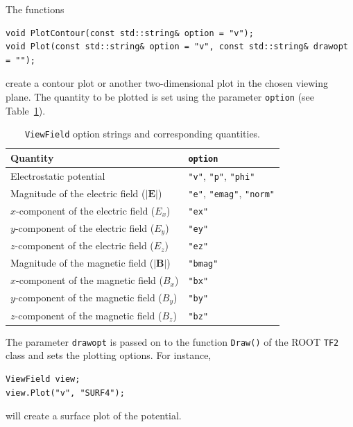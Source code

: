 The functions 
\begin{lstlisting}
void PlotContour(const std::string& option = "v");
void Plot(const std::string& option = "v", const std::string& drawopt = "");
\end{lstlisting}
create a contour plot or another two-dimensional plot in the chosen viewing plane.
The quantity to be plotted is set using the parameter \texttt{option} 
(see Table~\ref{Tab:ViewFieldOptionStrings}).
\begin{table}
  \centering
  \caption{\texttt{ViewField} option strings and corresponding quantities.}
  \label{Tab:ViewFieldOptionStrings}
  \begin{tabular}{l l} 
    \toprule
    Quantity & \texttt{option} \\
    \midrule
    Electrostatic potential & \texttt{"v"}, \texttt{"p"}, \texttt{"phi"} \\
    Magnitude of the electric field ($\left|\mathbf{E}\right|$) & \texttt{"e"}, \texttt{"emag"}, \texttt{"norm"} \\
    $x$-component of the electric field ($E_{x}$) & \texttt{"ex"} \\ 
    $y$-component of the electric field ($E_{y}$) & \texttt{"ey"} \\ 
    $z$-component of the electric field ($E_{z}$) & \texttt{"ez"} \\
    \midrule 
    Magnitude of the magnetic field ($\left|\mathbf{B}\right|$) & \texttt{"bmag"} \\
    $x$-component of the magnetic field ($B_{x}$) & \texttt{"bx"} \\ 
    $y$-component of the magnetic field ($B_{y}$) & \texttt{"by"} \\ 
    $z$-component of the magnetic field ($B_{z}$) & \texttt{"bz"} \\ 
    \bottomrule
  \end{tabular}
\end{table}
The parameter \texttt{drawopt} is passed on to the function \texttt{Draw()} of the
ROOT \texttt{TF2} class and sets the plotting options. For instance,
\begin{lstlisting}
ViewField view;
view.Plot("v", "SURF4");
\end{lstlisting}
will create a surface plot of the potential.

